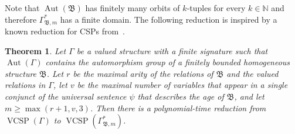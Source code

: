 \documentclass[nonacm]{acmart}
\newcommand{\N}{\mathbb N}
\newcommand{\bB}{{\mathfrak B}}
\DeclareMathOperator{\Aut}{Aut}
\DeclareMathOperator{\VCSP}{VCSP}
\newtheorem{theorem}{Theorem}[section]
\begin{document}
Note that $\Aut(\bB)$ 
has finitely many orbits of $k$-tuples for every $k \in \N$ and therefore $\Gamma^*_{\bB,m}$ has a finite domain.
The following reduction is inspired by a known reduction for CSPs from~\cite{BodMot-Unary}. 

\begin{theorem}\label{thm:red-fin}
Let $\Gamma$ be a valued structure with a finite signature such that $\Aut(\Gamma)$ contains the automorphism group of a finitely bounded
homogeneous structure $\bB$.
Let $r$ be the maximal arity of the relations of $\bB$ and the valued relations in $\Gamma$,
let $v$ be the maximal number of variables that appear in a single conjunct
of the universal sentence $\psi$ that describes the age 
of $\bB$,
and let $m \geq \max(r+1,v,3)$. 
Then there is a polynomial-time reduction from $\VCSP(\Gamma)$ to $\VCSP(\Gamma^*_{\bB,m})$.
\end{theorem}
\end{document}
